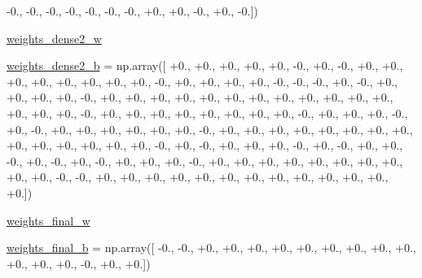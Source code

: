 \begin{DoxyCompactItemize}
-\/0., -\/0., -\/0., -\/0., -\/0., -\/0., -\/0., +0., +0., -\/0., +0., -\/0.\mbox{]})
\item 
\hyperlink{namespacepybullet-gym_1_1pybulletgym_1_1tests_1_1roboschool_1_1agents_1_1_humanoid_flagrun_py_bullet_env__v0__2017may_a771a82ef3fcf79fec262f5b870d61629}{weights\+\_\+dense2\+\_\+w}
\item 
\hyperlink{namespacepybullet-gym_1_1pybulletgym_1_1tests_1_1roboschool_1_1agents_1_1_humanoid_flagrun_py_bullet_env__v0__2017may_a843943d60d7a07b4c7b96c87ae8c84b1}{weights\+\_\+dense2\+\_\+b} = np.\+array(\mbox{[} +0., +0., +0., +0., +0., -\/0., +0., -\/0., +0., +0., +0., +0., +0., +0., +0., +0., -\/0., +0., +0., +0., +0., -\/0., -\/0., -\/0., +0., -\/0., +0., +0., +0., +0., -\/0., +0., +0., +0., +0., +0., +0., +0., +0., +0., +0., +0., +0., +0., +0., +0., -\/0., +0., +0., +0., +0., +0., +0., +0., +0., -\/0., +0., +0., +0., -\/0., +0., -\/0., +0., +0., +0., +0., +0., +0., -\/0., +0., +0., +0., +0., +0., +0., +0., +0., +0., +0., +0., +0., +0., +0., -\/0., +0., -\/0., +0., +0., +0., -\/0., +0., -\/0., +0., +0., -\/0., +0., -\/0., +0., -\/0., +0., +0., +0., -\/0., +0., +0., +0., +0., +0., +0., +0., +0., +0., +0., -\/0., -\/0., +0., +0., +0., +0., +0., +0., +0., +0., +0., +0., +0., +0., +0.\mbox{]})
\item 
\hyperlink{namespacepybullet-gym_1_1pybulletgym_1_1tests_1_1roboschool_1_1agents_1_1_humanoid_flagrun_py_bullet_env__v0__2017may_a0980fddc791ced2c83cd0747707833dd}{weights\+\_\+final\+\_\+w}
\item 
\hyperlink{namespacepybullet-gym_1_1pybulletgym_1_1tests_1_1roboschool_1_1agents_1_1_humanoid_flagrun_py_bullet_env__v0__2017may_a9d3469ab9e4c52b855e640e7e502aee0}{weights\+\_\+final\+\_\+b} = np.\+array(\mbox{[} -\/0., -\/0., +0., +0., +0., +0., +0., +0., +0., +0., +0., +0., +0., +0., -\/0., +0., +0.\mbox{]})
\end{DoxyCompactItemize}


